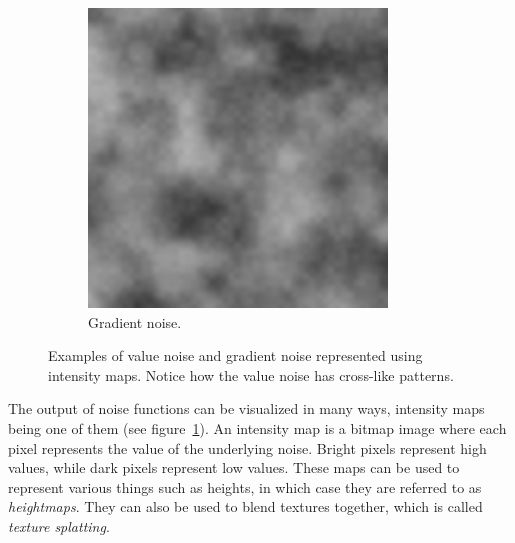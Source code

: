 \begin{figure}[h!]
\begin{subfigure}[b]{0.30\textwidth}
    \includegraphics[width=\textwidth]{figure/perlin_noise.png}
    \caption{Gradient noise. \cite{perlin_noise_img}}
  \end{subfigure}

  \caption{Examples of value noise and gradient noise represented using intensity maps. Notice how the value noise has cross-like patterns.}
  \label{fig:noisetypes}
\end{figure}

The output of noise functions can be visualized in many ways, intensity maps being one of them (see figure~\ref{fig:noisetypes}).
An intensity map is a bitmap image where each pixel represents the value of the underlying noise.
Bright pixels represent high values, while dark pixels represent low values.
These maps can be used to represent various things such as heights, in which case they are referred to as \textit{heightmaps}.
They can also be used to blend textures together, which is called \textit{texture splatting}.